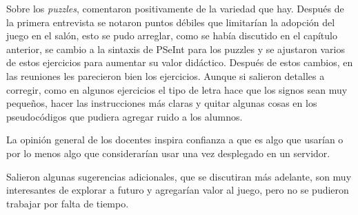 Sobre los \textit{puzzles}, comentaron positivamente de la variedad que hay. Después de la primera entrevista se notaron puntos débiles que limitarían la adopción del juego en el salón, esto se pudo arreglar, como se había discutido en el capítulo anterior, se cambio a la sintaxis de PSeInt para los puzzles y se ajustaron varios de estos ejercicios para aumentar su valor didáctico. Después de estos cambios, en las reuniones les parecieron bien los ejercicios. Aunque si salieron detalles a corregir, como en algunos ejercicios el tipo de letra hace que los signos sean muy pequeños, hacer las instrucciones más claras y quitar algunas cosas en los pseudocódigos que pudiera agregar ruido a los alumnos.

La opinión general de los docentes inspira confianza a que es algo que usarían o por lo menos algo que considerarían usar una vez desplegado en un servidor.

Salieron algunas sugerencias adicionales, que se discutiran más adelante, son muy interesantes de explorar a futuro y agregarían valor al juego, pero no se pudieron trabajar por falta de tiempo.
